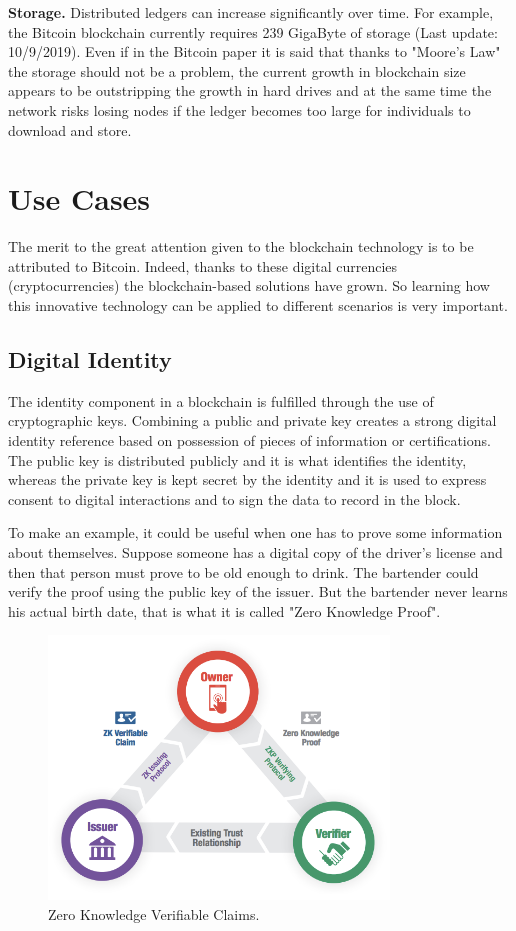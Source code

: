 \textbf{Storage.}
Distributed ledgers can increase significantly over time. For example, the Bitcoin blockchain
currently requires 239 GigaByte of storage (Last update: 10/9/2019). Even if in 
the Bitcoin paper it is said that thanks to "Moore's Law"\cite{bitcoin} the storage should
not be a problem, the current growth in blockchain size appears to be outstripping the growth
in hard drives and at the same time the network risks losing nodes if the ledger becomes too large for 
individuals to download and store.\cite{binancevision}


\section{Use Cases}
\label{sec:usecases}

The merit to the great attention given to the blockchain technology is to be attributed
to Bitcoin. Indeed, thanks to these digital currencies (cryptocurrencies) the 
blockchain-based solutions have grown. So learning how this innovative technology
can be applied to different scenarios is very important. 

\subsection{Digital Identity}
\label{sec:identity}

The identity component in a blockchain is fulfilled through the use of cryptographic keys.
Combining a public and private key creates a strong digital identity reference based 
on possession of pieces of information or certifications. The public key is distributed 
publicly and it is what identifies the identity, whereas the private key is kept secret by
the identity and it is used to express consent to digital interactions and to 
sign the data to record in the block.\cite{coindesk}

To make an example, it could be useful when one has to prove some information 
about themselves. Suppose someone has a digital copy of the driver's license 
and then that person must prove to be old enough to drink. The bartender could verify
the proof using the public key of the issuer. But the bartender never learns his
actual birth date, that is what it is called "Zero Knowledge Proof".\cite{sovrin}

\begin{figure}[h]
    \centering
    \includegraphics[height=7cm]{identity.png}
    \caption{Zero Knowledge Verifiable Claims.\cite{sovrin}}
    \label{fig:claim}
\end{figure}\pagebreak

